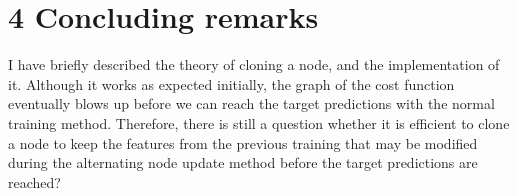\documentclass[12pt,english,]{article}
\begin{document}
\hypertarget{section4}{%
\section{\texorpdfstring{4 \enspace Concluding
remarks}{4 Concluding remarks}}\label{section4}}

I have briefly described the theory of cloning a node, and the implementation of it. Although it works as expected initially, the graph of the cost function eventually blows up before we can reach the target predictions with the normal training method. Therefore, there is still a question whether it is efficient to clone a node to keep the features from the previous training that may be modified during the alternating node update method before the target predictions are reached?
\end{document}
